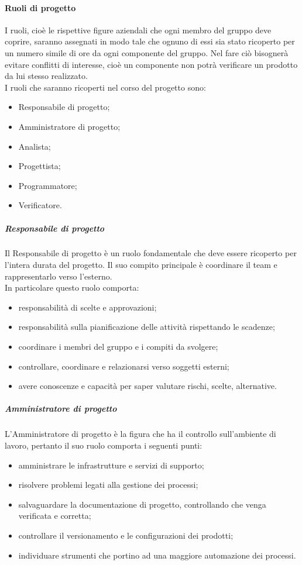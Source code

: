 \paragraph{Ruoli di progetto}
I ruoli, cioè le rispettive figure aziendali che ogni membro del gruppo deve coprire, saranno assegnati in modo tale che ognuno di essi sia stato ricoperto per un numero simile di ore da ogni componente del gruppo. Nel fare ciò bisognerà evitare conflitti di interesse, cioè un componente non potrà verificare un prodotto da lui stesso realizzato. \\
I ruoli che saranno ricoperti nel corso del progetto sono:
\begin{itemize}
    \item Responsabile di progetto;
    \item Amministratore di progetto;
    \item Analista;
    \item Progettista;
    \item Programmatore;
    \item Verificatore.
\end{itemize}

\subparagraph{Responsabile di progetto}
Il Responsabile di progetto è un ruolo fondamentale che deve essere ricoperto per l'intera durata del progetto. Il suo compito principale è coordinare il team e rappresentarlo verso l'esterno. \\
In particolare questo ruolo comporta:
\begin{itemize}
    \item responsabilità di scelte e approvazioni;
    \item responsabilità sulla pianificazione delle attività rispettando le scadenze;
    \item coordinare i membri del gruppo e i compiti da svolgere;
    \item controllare, coordinare e relazionarsi verso soggetti esterni;
    \item avere conoscenze e capacità per saper valutare rischi, scelte, alternative.
\end{itemize}

\subparagraph{Amministratore di progetto}
L'Amministratore di progetto è la figura che ha il controllo sull'ambiente di lavoro, pertanto il suo ruolo comporta i seguenti punti:
\begin{itemize}
    \item amministrare le infrastrutture e servizi di supporto;
    \item risolvere problemi legati alla gestione dei processi;
    \item salvaguardare la documentazione di progetto, controllando che venga verificata e corretta;
    \item controllare il versionamento e le configurazioni dei prodotti;
    \item individuare strumenti che portino ad una maggiore automazione dei processi.
\end{itemize}

